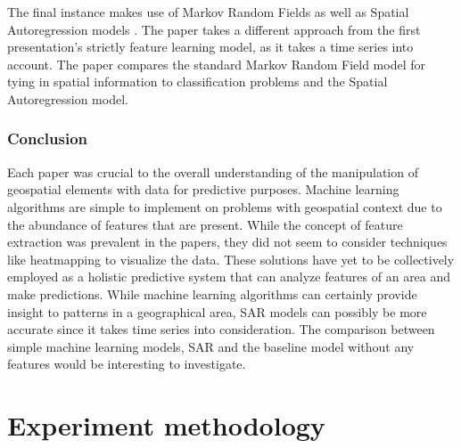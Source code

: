 \documentclass[12pt]{article}
\begin{document}
   The final instance makes use of Markov Random Fields as well as Spatial Autoregression models \cite{autoreg}. The paper takes a different approach from the first presentation's strictly feature learning model, as it takes a time series into account. The paper compares the standard Markov Random Field model for tying in spatial information to classification problems and the Spatial Autoregression model. 

   \subsubsection{Conclusion}
   Each paper was crucial to the overall understanding of the manipulation of geospatial elements with data for predictive purposes. Machine learning algorithms are simple to implement on problems with geospatial context due to the abundance of features that are present. While the concept of feature extraction was prevalent in the papers, they did not seem to consider techniques like heatmapping to visualize the data. These solutions have yet to be collectively employed as a holistic predictive system that can analyze features of an area and make predictions. While machine learning algorithms can certainly provide insight to patterns in a geographical area, SAR models can possibly be more accurate since it takes time series into consideration. The comparison between simple machine learning models, SAR and the baseline model without any features would be interesting to investigate. 




\section{Experiment methodology}
\end{document}
